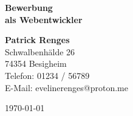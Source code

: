 \documentclass[a4paper,12pt]{article}
\begin{document}
\thispagestyle{empty} %

\begin{flushright}
\end{flushright}

\vspace*{2cm}

\begin{center}
  {\LARGE \textbf{Bewerbung}}\\[0.5cm]
  {\Large \textbf{als Webentwickler}} %
\end{center}

\vspace{2cm}

\noindent
\textbf{Patrick Renges} \\
Schwalbenhälde 26\\
74354 Besigheim \\
Telefon: 01234 / 56789 \\
E-Mail: evelinerenges@proton.me \\

\vfill

\begin{flushright}
\today
\end{flushright}
\end{document}
